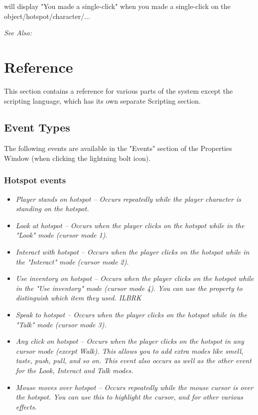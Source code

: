 will display "You made a single-click" when you made a single-click on the object/hotspot/character/...

\it{See Also:} 




\chapter{Reference}%

This section contains a reference for various parts of the system except the scripting
language, which has its own separate Scripting section.

\section{Event Types}%

The following events are available in the "Events" section of the Properties Window
(when clicking the lightning bolt icon).

\subsection{Hotspot events}%

\begin{itemize}
\item \it{Player stands on hotspot} -- Occurs repeatedly while the player character
is standing on the hotspot.
\item \it{Look at hotspot} -- Occurs when the player clicks on the hotspot while in
the "Look" mode (cursor mode 1).
\item \it{Interact with hotspot} -- Occurs when the player clicks on the hotspot while
in the "Interact" mode (cursor mode 2).
\item \it{Use inventory on hotspot} -- Occurs when the player clicks on the hotspot
while in the "Use inventory" mode (cursor mode 4). You can use the
 property to distinguish
which item they used. ILBRK
\item \it{Speak to hotspot} -- Occurs when the player clicks on the hotspot while in
the "Talk" mode (cursor mode 3).
\item \it{Any click on hotspot} -- Occurs when the player clicks on the hotspot in
any cursor mode (except Walk). This allows you to add extra modes like
smell, taste, push, pull, and so on. This event also occurs as well as
the other event for the Look, Interact and Talk modes.
\item \it{Mouse moves over hotspot} -- Occurs repeatedly while the mouse cursor is
over the hotspot. You can use this to highlight the cursor, and for other
various effects.
\end{itemize}

